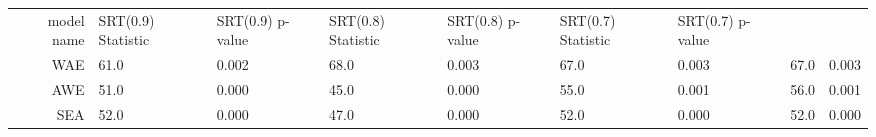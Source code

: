 \begin{tabular}{|r|l|l|l|l|l|l|}
  \hline
  model name & SRT(0.9) Statistic & SRT(0.9) p-value & SRT(0.8) Statistic & SRT(0.8) p-value & SRT(0.7) Statistic & SRT(0.7) p-value \\ 
  WAE & 61.0 & 0.002 & 68.0 & 0.003 & 67.0 & 0.003 & 67.0 & 0.003 \\ 
  AWE & 51.0 & 0.000 & 45.0 & 0.000 & 55.0 & 0.001 & 56.0 & 0.001 \\ 
  SEA & 52.0 & 0.000 & 47.0 & 0.000 & 52.0 & 0.000 & 52.0 & 0.000 \\ 
\end{tabular}
